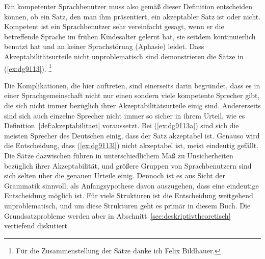 Ein kompetenter Sprachbenutzer muss also gemäß dieser Definition entscheiden können, ob ein Satz, den man ihm präsentiert, ein akzeptabler Satz ist oder nicht.
Kompetent ist ein Sprachbenutzer sehr vereinfacht gesagt, wenn er die betreffende Sprache im frühen Kindesalter gelernt hat, sie seitdem kontinuierlich benutzt hat und an keiner Sprachstörung (Aphasie) leidet.
Dass Akzeptabilitätsurteile nicht unproblematisch sind demonstrieren die Sätze in (\ref{ex:dg9113}).%
\footnote{Für die Zusammenstellung der Sätze danke ich Felix Bildhauer.}

\begin{exe}
  \ex\label{ex:dg9113}
  \begin{xlist}
  \end{xlist}
\end{exe}

Die Komplikationen, die hier auftreten, sind einerseits darin begründet, dass es in einer Sprachgemeinschaft nicht nur einen sondern viele kompetente Sprecher gibt, die sich nicht immer bezüglich ihrer Akzeptabilitätsurteile einig sind.  
Andererseits sind sich auch einzelne Sprecher nicht immer so sicher in ihrem Urteil, wie es Definition~\ref{def:akzeptabilitaet} voraussetzt.
Bei (\ref{ex:dg9113a}) sind sich die meisten Sprecher des Deutschen einig, dass der Satz akzeptabel ist.
Genauso wird die Entscheidung, dass (\ref{ex:dg9113l}) nicht akzeptabel ist, meist eindeutig gefällt.
Die Sätze dazwischen führen in unterschiedlichem Maß zu Unsicherheiten bezüglich ihrer Akzeptabilität, und größere Gruppen von Sprachbenutzern sind sich selten über die genauen Urteile einig.
Dennoch ist es aus Sicht der Grammatik sinnvoll, als Anfangsypothese davon auszugehen, dass eine eindeutige Entscheidung möglich ist.
Für viele Strukturen ist die Entscheidung weitgehend unproblematisch, und um diese Strukturen geht es primär in diesem Buch.
Die Grundsatzprobleme werden aber in Abschnitt~\ref{sec:deskriptivtheoretisch} vertiefend diskutiert.

